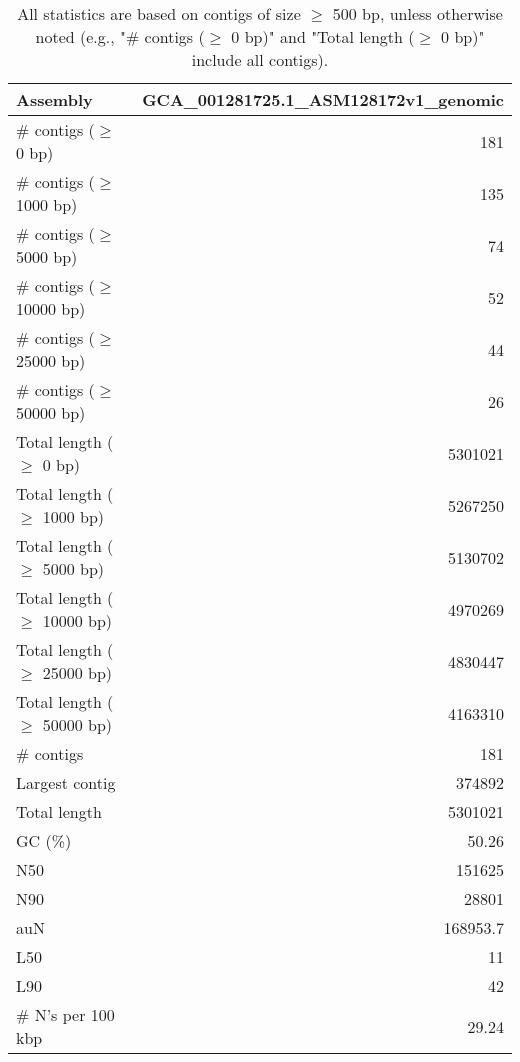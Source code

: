 \documentclass[12pt,a4paper]{article}
\begin{document}
\begin{table}[ht]
\begin{center}
\caption{All statistics are based on contigs of size $\geq$ 500 bp, unless otherwise noted (e.g., "\# contigs ($\geq$ 0 bp)" and "Total length ($\geq$ 0 bp)" include all contigs).}
\begin{tabular}{|l*{1}{|r}|}
\hline
Assembly & GCA\_001281725.1\_ASM128172v1\_genomic \\ \hline
\# contigs ($\geq$ 0 bp) & 181 \\ \hline
\# contigs ($\geq$ 1000 bp) & 135 \\ \hline
\# contigs ($\geq$ 5000 bp) & 74 \\ \hline
\# contigs ($\geq$ 10000 bp) & 52 \\ \hline
\# contigs ($\geq$ 25000 bp) & 44 \\ \hline
\# contigs ($\geq$ 50000 bp) & 26 \\ \hline
Total length ($\geq$ 0 bp) & 5301021 \\ \hline
Total length ($\geq$ 1000 bp) & 5267250 \\ \hline
Total length ($\geq$ 5000 bp) & 5130702 \\ \hline
Total length ($\geq$ 10000 bp) & 4970269 \\ \hline
Total length ($\geq$ 25000 bp) & 4830447 \\ \hline
Total length ($\geq$ 50000 bp) & 4163310 \\ \hline
\# contigs & 181 \\ \hline
Largest contig & 374892 \\ \hline
Total length & 5301021 \\ \hline
GC (\%) & 50.26 \\ \hline
N50 & 151625 \\ \hline
N90 & 28801 \\ \hline
auN & 168953.7 \\ \hline
L50 & 11 \\ \hline
L90 & 42 \\ \hline
\# N's per 100 kbp & 29.24 \\ \hline
\end{tabular}
\end{center}
\end{table}
\end{document}
